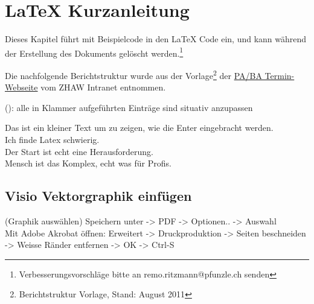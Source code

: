 %
%

\chapter{LaTeX Kurzanleitung}\label{chap.anleitung}
Dieses Kapitel führt mit Beispielcode in den LaTeX Code ein, und kann während der Erstellung des Dokuments gelöscht werden.\footnote{Verbesserungsvorschläge bitte an remo.ritzmann@pfunzle.ch senden}

Die nachfolgende Berichtstruktur wurde aus der Vorlage\footnote{Berichtstruktur Vorlage, Stand: August 2011} der \href{https://intra.zhaw.ch/departemente/school-of-engineering/studium-standort-winterthur/studierende/projektarbeit-bachelorarbeit.html}{PA/BA Termin-Webseite} vom ZHAW Intranet entnommen.

(): alle in Klammer aufgeführten Einträge sind situativ anzupassen



Das ist ein kleiner Text um zu zeigen, wie die Enter eingebracht werden.\\
Ich finde Latex schwierig.\\
Der Start ist echt eine Herausforderung. \\
Mensch ist das Komplex, echt was für Profis. %



\section{Visio Vektorgraphik einfügen}\label{visio}
(Graphik auswählen) Speichern unter -> PDF -> Optionen.. -> Auswahl\\
Mit Adobe Akrobat öffnen: Erweitert -> Druckproduktion -> Seiten beschneiden -> Weisse Ränder entfernen -> OK -> Ctrl-S

